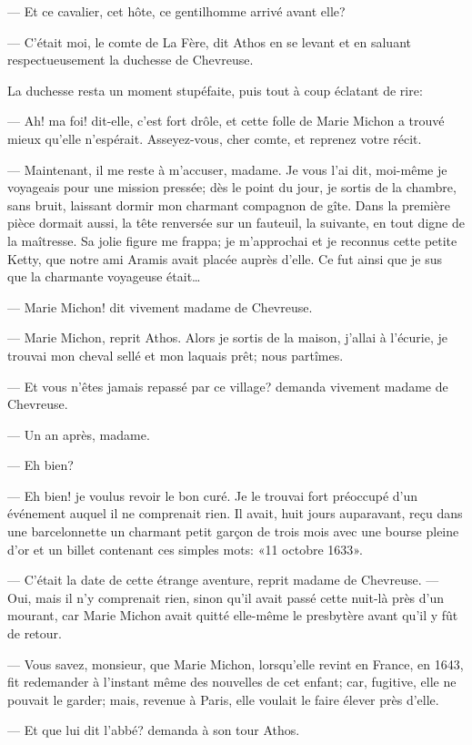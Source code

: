 — Et ce cavalier, cet hôte, ce gentilhomme arrivé avant elle?

— C'était moi, le comte de La Fère, dit Athos en se levant et en saluant respectueusement la duchesse de Chevreuse.

La duchesse resta un moment stupéfaite, puis tout à coup éclatant de rire:

— Ah! ma foi! dit-elle, c'est fort drôle, et cette folle de Marie Michon a trouvé mieux qu'elle n'espérait. Asseyez-vous, cher comte, et reprenez votre récit.

— Maintenant, il me reste à m'accuser, madame. Je vous l'ai dit, moi-même je voyageais pour une mission pressée; dès le point du jour, je sortis de la chambre, sans bruit, laissant dormir mon charmant compagnon de gîte. Dans la première pièce dormait aussi, la tête renversée sur un fauteuil, la suivante, en tout digne de la maîtresse. Sa jolie figure me frappa; je m'approchai et je reconnus cette petite Ketty, que notre ami Aramis avait placée auprès d'elle. Ce fut ainsi que je sus que la charmante voyageuse était\dots

— Marie Michon! dit vivement madame de Chevreuse.

— Marie Michon, reprit Athos. Alors je sortis de la maison, j'allai à l'écurie, je trouvai mon cheval sellé et mon laquais prêt; nous partîmes.

— Et vous n'êtes jamais repassé par ce village? demanda vivement madame de Chevreuse.

— Un an après, madame.

— Eh bien?

— Eh bien! je voulus revoir le bon curé. Je le trouvai fort préoccupé d'un événement auquel il ne comprenait rien. Il avait, huit jours auparavant, reçu dans une barcelonnette un charmant petit garçon de trois mois avec une bourse pleine d'or et un billet contenant ces simples mots: «11 octobre 1633».

— C'était la date de cette étrange aventure, reprit madame de Chevreuse.
— Oui, mais il n'y comprenait rien, sinon qu'il avait passé cette nuit-là près d'un mourant, car Marie Michon avait quitté elle-même le presbytère avant qu'il y fût de retour.

— Vous savez, monsieur, que Marie Michon, lorsqu'elle revint en France, en 1643, fit redemander à l'instant même des nouvelles de cet enfant; car, fugitive, elle ne pouvait le garder; mais, revenue à Paris, elle voulait le faire élever près d'elle.

— Et que lui dit l'abbé? demanda à son tour Athos.

